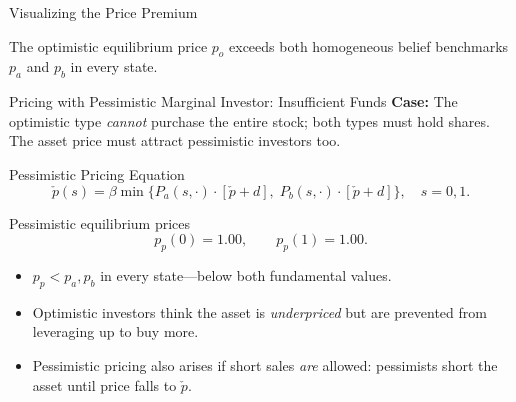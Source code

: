 \documentclass[aspectratio=169]{beamer}
\newcommand{\pcheck}{\check{p}}
\begin{document}
\begin{frame}{Visualizing the Price Premium}
  \begin{center}
  \end{center}

  \footnotesize The optimistic equilibrium price $p_o$ exceeds both homogeneous
  belief benchmarks $p_a$ and $p_b$ in every state.
\end{frame}

\begin{frame}{Pricing with Pessimistic Marginal Investor: Insufficient Funds}
  \textbf{Case:} The optimistic type \emph{cannot} purchase the entire stock;
  both types must hold shares.  The asset price must attract pessimistic
  investors too.

  \begin{alertblock}{Pessimistic Pricing Equation}
    \[
      \pcheck(s) = \beta \min\bigl\{
        P_a(s,\cdot)\cdot[\pcheck + d],\;
        P_b(s,\cdot)\cdot[\pcheck + d]
      \bigr\}, \quad s=0,1.
    \]
  \end{alertblock}

  \medskip
  \begin{block}{Pessimistic equilibrium prices}
    \[
      p_p(0) = 1.00, \qquad p_p(1) = 1.00.
    \]
  \end{block}

  \medskip
  \begin{itemize}
    \item $p_p < p_a, p_b$ in every state---below both fundamental values.
    \item Optimistic investors think the asset is \emph{underpriced} but are
          prevented from leveraging up to buy more.
    \item Pessimistic pricing also arises if short sales \emph{are} allowed:
          pessimists short the asset until price falls to $\pcheck$.
  \end{itemize}
\end{frame}
\end{document}
